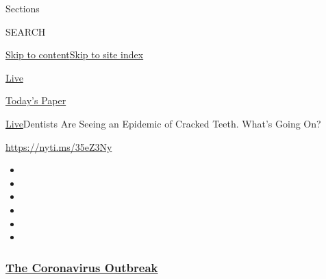 Sections

SEARCH

\protect\hyperlink{site-content}{Skip to
content}\protect\hyperlink{site-index}{Skip to site index}

\href{https://www.nytimes3xbfgragh.onion/section/well/live}{Live}

\href{https://myaccount.nytimes3xbfgragh.onion/auth/login?response_type=cookie\&client_id=vi}{}

\href{https://www.nytimes3xbfgragh.onion/section/todayspaper}{Today's
Paper}

\href{/section/well/live}{Live}\textbar{}Dentists Are Seeing an Epidemic
of Cracked Teeth. What's Going On?

\url{https://nyti.ms/35eZ3Ny}

\begin{itemize}
\item
\item
\item
\item
\item
\item
\end{itemize}

\hypertarget{the-coronavirus-outbreak}{%
\subsubsection{\texorpdfstring{\href{https://www.nytimes3xbfgragh.onion/news-event/coronavirus?name=styln-coronavirus-national\&region=TOP_BANNER\&block=storyline_menu_recirc\&action=click\&pgtype=Article\&impression_id=72050c80-f1f0-11ea-a7d5-df0e27ecb6dd\&variant=undefined}{The
Coronavirus
Outbreak}}{The Coronavirus Outbreak}}\label{the-coronavirus-outbreak}}

